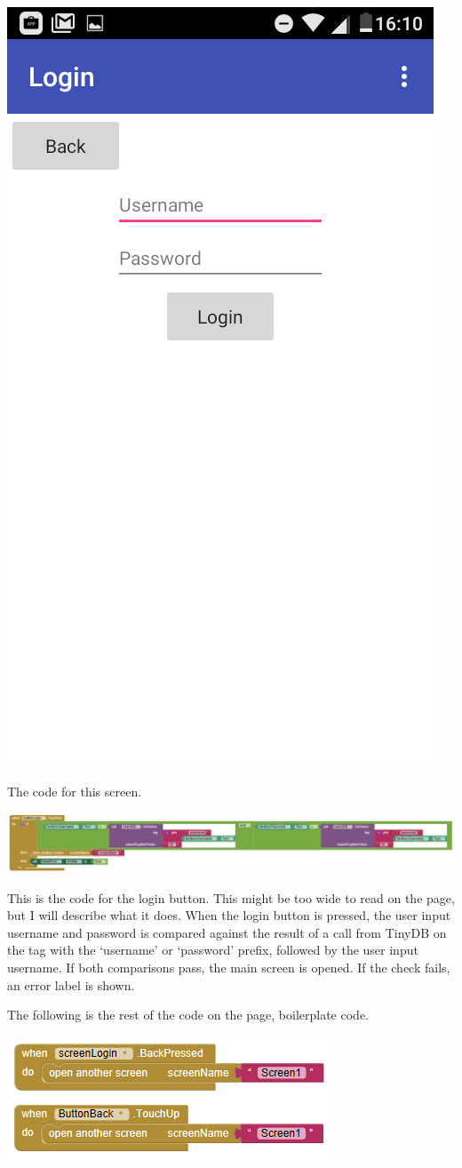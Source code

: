 \documentclass{scrreprt}
\begin{document}
\begin{center}
    \includegraphics[width=0.5\linewidth]{images/loginDesign.png}
\end{center}

The code for this screen.

\begin{center}
    \includegraphics[width=\linewidth]{images/loginButton.png}
\end{center}

This is the code for the login button. This might be too wide to read on the page, but I will describe what it does. When the login button is pressed, the user input username and password is compared against the result of a call from TinyDB on the tag with the `username' or `password' prefix, followed by the user input username. If both comparisons pass, the main screen is opened. If the check fails, an error label is shown.

The following is the rest of the code on the page, boilerplate code.

\begin{center}
    \includegraphics[width=0.75\linewidth]{images/loginOther.png}
\end{center}
\end{document}
